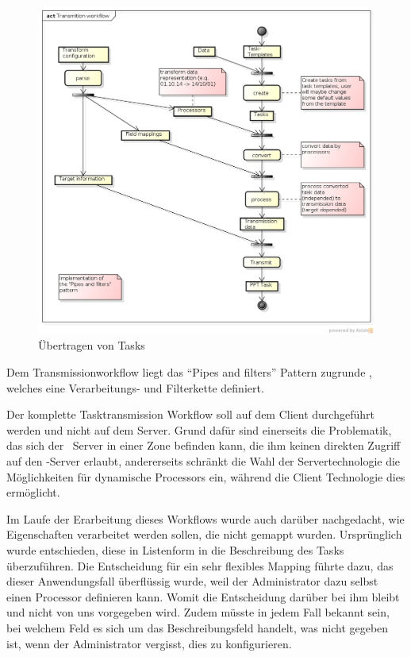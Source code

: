 			\begin{figure}[H]
				\includegraphics[width=\textwidth]{architecture/media/img/transmissionWorkflow.png}
				\centering
				\caption{Übertragen von Tasks}
				\label{fig:transmissionWorkflow}
			\end{figure}
			Dem Transmissionworkflow liegt das "`Pipes and filters"' Pattern zugrunde
			 \cite{hope_enterprise_2003}, welches eine Verarbeitungs- und Filterkette definiert.
			
			Der komplette Tasktransmission Workflow soll auf dem Client durchgeführt werden und nicht auf dem Server. Grund dafür sind einerseits die Problematik, 
			das sich der \eeppi\ Server in einer Zone befinden kann, 
			die ihm keinen direkten Zugriff auf den \ppt-Server erlaubt,
			andererseits schränkt die Wahl der Servertechnologie die Möglichkeiten für dynamische Processors ein, während die Client Technologie dies ermöglicht.
			
			Im Laufe der Erarbeitung dieses Workflows wurde auch darüber nachgedacht, 
			wie Eigenschaften verarbeitet werden sollen, die nicht gemappt wurden. 
			Ursprünglich wurde entschieden, diese in Listenform in die Beschreibung des Tasks
			überzuführen. 
			Die Entscheidung für ein sehr flexibles Mapping führte dazu, 
			das dieser Anwendungsfall überflüssig wurde, 
			weil der Administrator dazu selbst einen Processor definieren kann.
			Womit die Entscheidung darüber bei ihm bleibt und nicht von uns vorgegeben wird.
			Zudem müsste in jedem Fall bekannt sein, 
			bei welchem Feld es sich um das Beschreibungsfeld handelt, 
			was nicht gegeben ist, wenn der Administrator vergisst, dies zu konfigurieren.
		
